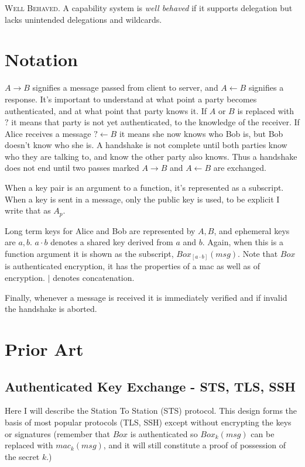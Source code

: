 \documentclass[12pt]{article}
\begin{document}
\textsc{Well Behaved}. A capability system is
\emph{well behaved} if it supports delegation but lacks unintended
delegations and wildcards.

\section{Notation}

$A \to B$ signifies a message passed from client to server, and
$A \gets B$ signifies a response. It's important to understand
at what point a party becomes authenticated, and at what point
that party knows it. If $A$ or $B$ is replaced with $?$ it
means that party is not yet authenticated, to the knowledge
of the receiver. If Alice receives a message $? \gets B$ it means
she now knows who Bob is, but Bob doesn't know who she is.
A handshake is not complete until both parties know who they are
talking to, and know the other party also knows. Thus a handshake
does not end until two passes marked $A \to B$ and $A \gets B$
are exchanged.

When a key pair is an argument to a function,
it's represented as a subscript. When a key is sent in a message,
only the public key is used, to be explicit I write that as $A_p$.

Long term keys for Alice and Bob are represented by $A,B$,
and ephemeral keys are $a,b$. $a \cdot b$ denotes a shared key derived
from $a$ and $b$. Again, when this is a function argument it is shown
as the subscript, $Box_{[a\cdot b]}(msg)$. Note that
$Box$ is authenticated encryption, it has the
properties of a mac as well as of encryption. $|$ denotes concatenation.

Finally, whenever a message is received it is immediately verified
and if invalid the handshake is aborted.

\section{Prior Art}

\subsection{Authenticated Key Exchange - STS, TLS, SSH}

Here I will describe the Station To Station (STS) protocol\cite{aake}.
This design forms the basis of most popular protocols (TLS, SSH)
except without encrypting the keys or signatures (remember that $Box$
is authenticated so $Box_k(msg)$ can be replaced with $mac_k(msg)$,
and it will still constitute a proof of possession of the secret $k$.)
\end{document}
